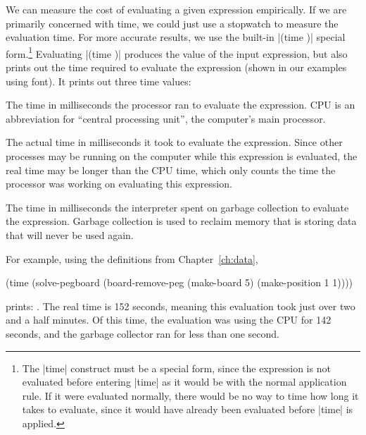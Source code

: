 \begin{schemeregion}
We can measure the cost of evaluating a given expression empirically.  If we are primarily concerned with time, we could just use a stopwatch to measure the evaluation time.  For more accurate results, we use the built-in \scheme|(time \Expression)| special form.\footnote{The \scheme|time| construct must be a special form, since the expression is not evaluated before entering \scheme|time| as it would be with the normal application rule.  If it were evaluated normally, there would be no way to time how long it takes to evaluate, since it would have already been evaluated before \scheme|time| is applied.}  Evaluating \scheme|(time \Expression)| produces the value of the input expression, but also prints out the time required to evaluate the expression (shown in our examples using  font).  It prints out three time values:
\begin{descriptionlist}
\item [\soutput{cpu time}] \forcenl The time in milliseconds the processor ran to evaluate the expression.  CPU is an abbreviation for ``central processing unit'', the computer's main processor.
\item [\soutput{real time}] \forcenl The actual time in milliseconds it took to evaluate the expression.  Since other processes may be running on the computer while this expression is evaluated, the real time may be longer than the CPU time, which only counts the time the processor was working on evaluating this expression.
\item [\soutput{gc time}] \forcenl The time in milliseconds the interpreter spent on garbage collection to evaluate the expression.  Garbage collection is used to reclaim memory that is storing data that will never be used again.  
\end{descriptionlist}

For example, using the definitions from Chapter~\ref{ch:data}, 
\begin{schemedisplay}
(time (solve-pegboard (board-remove-peg (make-board 5) 
                                        (make-position 1 1))))
\end{schemedisplay}
prints: .  The real time is 152 seconds, meaning this evaluation took just over two and a half minutes.  Of this time, the evaluation was using the CPU for 142 seconds, and the garbage collector ran for less than one second.


\end{schemeregion}
